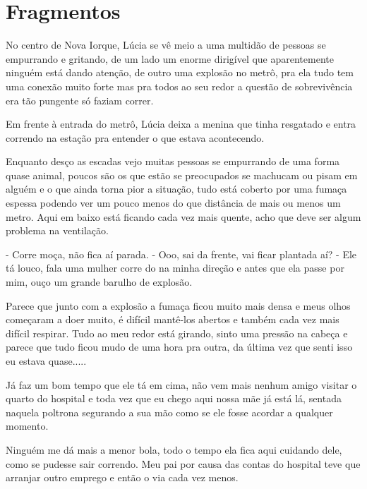 
\chapter{Fragmentos}
    



No centro de Nova Iorque, Lúcia se vê meio a uma multidão de pessoas se empurrando e gritando, de um lado um enorme dirigível que aparentemente ninguém está dando atenção, de outro uma explosão no metrô, pra ela tudo tem uma conexão muito forte mas pra todos ao seu redor a questão de sobrevivência era tão pungente só faziam correr.

Em frente à entrada do metrô, Lúcia deixa a menina que tinha resgatado e entra correndo na estação pra entender o que estava acontecendo.

Enquanto desço as escadas vejo muitas pessoas se empurrando de uma forma quase animal, poucos são os que estão se preocupados se machucam ou pisam em alguém e o que ainda torna pior a situação, tudo está coberto por uma fumaça espessa podendo ver um pouco menos do que distância de mais ou menos um metro.
Aqui em baixo está ficando cada vez mais quente, acho que deve ser algum problema na ventilação.

- Corre moça, não fica aí parada.
- Ooo, sai da frente, vai ficar plantada aí?
- Ele tá louco, fala uma mulher corre do na minha direção e antes que ela passe por mim, ouço um grande barulho de explosão.

Parece que junto com a explosão a fumaça ficou muito mais densa e meus olhos começaram a doer muito, é difícil mantê-los abertos e também cada vez mais difícil respirar.
Tudo ao meu redor está girando, sinto uma pressão na cabeça e parece que tudo ficou mudo de uma hora pra outra, da última vez que senti isso eu estava quase.....


Já faz um bom tempo que ele tá em cima, não vem mais nenhum amigo visitar o quarto do hospital e toda vez que eu chego aqui nossa mãe já está lá, sentada naquela poltrona segurando a sua mão como se ele fosse acordar a qualquer momento.

Ninguém me dá mais a menor bola, todo o tempo ela fica aqui cuidando dele, como se pudesse sair correndo. Meu pai por causa das contas do hospital teve que arranjar outro emprego e então o via cada vez menos.

